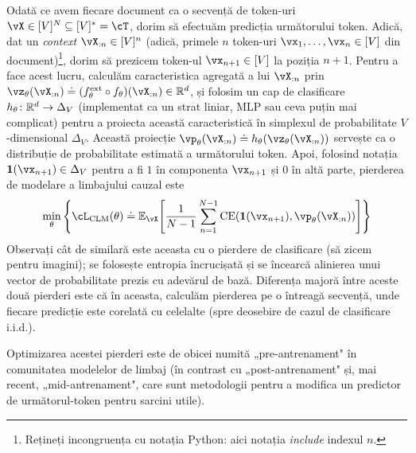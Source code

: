\documentclass[../../book-main_ro.tex]{subfiles}
\begin{document}
Odată ce avem fiecare document ca o secvență de token-uri \(\vX \in [V]^{N} \subseteq [V]^{*} = \cT\), dorim să efectuăm predicția următorului token. Adică, dat un \textit{context} \(\vX_{:n} \in [V]^{n}\) (adică, primele \(n\) token-uri \(\vx_{1}, \dots, \vx_{n} \in [V]\) din document)\footnote{Rețineți incongruența cu notația Python: aici notația \textit{include} indexul \(n\).}, dorim să prezicem token-ul \(\vx_{n + 1} \in [V]\) la poziția \(n + 1\). Pentru a face acest lucru, calculăm caracteristica agregată a lui \(\vX_{:n}\) prin \(\vz_{\theta}(\vX_{:n}) \doteq (f_{\theta}^{\ext} \circ f_{\theta})(\vX_{:n}) \in \R^{d}\), și folosim un cap de clasificare \(h_{\theta} \colon \mathbb{R}^{d} \to \Delta_{V}\) (implementat ca un strat liniar, MLP sau ceva puțin mai complicat) pentru a proiecta această caracteristică în simplexul de probabilitate \(V\)-dimensional \(\Delta_{V}\). Această proiecție \(\vp_{\theta}(\vX_{:n}) \doteq h_{\theta}(\vz_{\theta}(\vX_{:n}))\) servește ca o distribuție de probabilitate estimată a următorului token. Apoi, folosind notația \(\vone(\vx_{n + 1}) \in \Delta_{V}\) pentru a fi \(1\) în componenta \(\vx_{n + 1}\) și \(0\) în altă parte, pierderea de modelare a limbajului cauzal este
\begin{equation}\label{eq:clm_loss}
    \min_{\theta}\bc{\cL_{\mathrm{CLM}}(\theta) \doteq \Ex_{\vX}\rs{\frac{1}{N - 1}\sum_{n = 1}^{N - 1}\CE(\vone(\vx_{n + 1}), \vp_{\theta}(\vX_{:n}))}}
\end{equation}
Observați cât de similară este aceasta cu o pierdere de clasificare (să zicem pentru imagini); se folosește entropia încrucișată și se încearcă alinierea unui vector de probabilitate prezis cu adevărul de bază. Diferența majoră între aceste două pierderi este că în aceasta, calculăm pierderea pe o întreagă secvență, unde fiecare predicție este corelată cu celelalte (spre deosebire de cazul de clasificare i.i.d.).

Optimizarea acestei pierderi este de obicei numită „pre-antrenament" în comunitatea modelelor de limbaj (în contrast cu „post-antrenament" și, mai recent, „mid-antrenament", care sunt metodologii pentru a modifica un predictor de următorul-token pentru sarcini utile).
\end{document}
